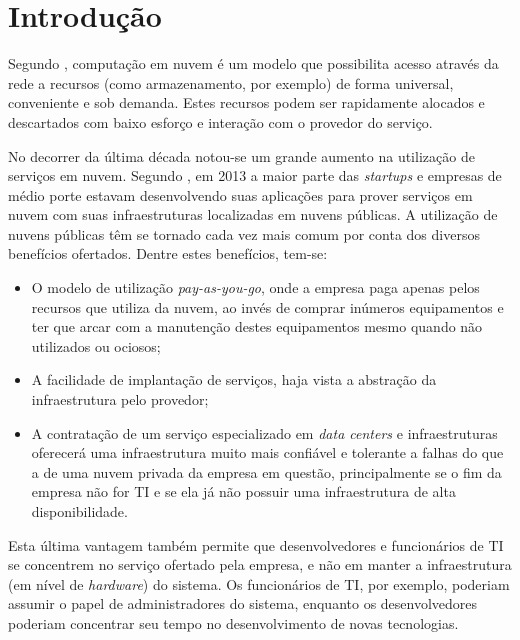 
\chapter{Introdução}
\label{c_introducao}

Segundo , computação em nuvem é um modelo que possibilita acesso através da rede a recursos (como armazenamento, por exemplo) de forma universal, conveniente e sob demanda. Estes recursos podem ser rapidamente alocados e descartados com baixo esforço e interação com o provedor do serviço.

No decorrer da última década notou-se um grande aumento na utilização de serviços em nuvem. Segundo , em 2013 a maior parte das \textit{startups} e empresas de médio porte estavam desenvolvendo suas aplicações para prover serviços em nuvem com suas infraestruturas localizadas em nuvens públicas. A utilização de nuvens públicas têm se tornado cada vez mais comum por conta dos diversos benefícios ofertados. Dentre estes benefícios, tem-se:

\begin{itemize}
    \item O modelo de utilização \textit{pay-as-you-go}, onde a empresa paga apenas pelos recursos que utiliza da nuvem, ao invés de comprar inúmeros equipamentos e ter que arcar com a manutenção destes equipamentos mesmo quando não utilizados ou ociosos;
    \item A facilidade de implantação de serviços, haja vista a abstração da infraestrutura pelo provedor;
    \item A contratação de um serviço especializado em \textit{data centers} e infraestruturas oferecerá uma infraestrutura muito mais confiável e tolerante a falhas do que a de uma nuvem privada da empresa em questão, principalmente se o fim da empresa não for \ac{TI} e se ela já não possuir uma infraestrutura de alta disponibilidade.
\end{itemize}

Esta última vantagem também permite que desenvolvedores e funcionários de \ac{TI} se concentrem no serviço ofertado pela empresa, e não em manter a infraestrutura (em nível de \textit{hardware}) do sistema. Os funcionários de \ac{TI}, por exemplo, poderiam assumir o papel de administradores do sistema, enquanto os desenvolvedores poderiam concentrar seu tempo no desenvolvimento de novas tecnologias.

